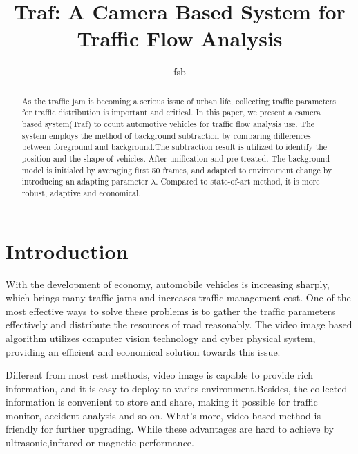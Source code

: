 \documentclass[draftclsnofoot,onecolumn]{IEEEtran}
\begin{document}
\title{Traf: A Camera Based System for Traffic Flow Analysis}
\maketitle
\author{fsb}

\begin{abstract}
As the traffic jam is becoming a serious issue of urban life, collecting traffic parameters for traffic distribution is important and critical.
In this paper, we present a camera based system(Traf) to count automotive vehicles for traffic flow analysis use. The system employs the method of background subtraction by comparing differences between foreground and background.The subtraction result is utilized to identify the position and the shape of vehicles. After unification and pre-treated. The background model is initialed by averaging first 50 frames, and adapted to environment change by introducing an adapting parameter $\lambda$. Compared to state-of-art method, it is more robust, adaptive and economical.

\end{abstract}


\section{Introduction}
With the development of economy, automobile vehicles is increasing sharply, which brings many traffic jams and increases traffic management cost. One of the most effective ways to solve these problems is to gather the traffic parameters effectively and distribute the resources of road reasonably.\cite{Gettys90} The video image based algorithm utilizes computer vision technology and cyber physical system, providing an efficient and economical solution towards this issue.

	Different from most rest methods, video image is capable to provide rich information, and it is easy to deploy to varies environment.Besides, the collected information is convenient to store and share, making it possible for traffic monitor, accident analysis and so on. What's more, video based method is friendly for further upgrading. While these advantages are hard to achieve by ultrasonic,infrared or magnetic performance.
\end{document}
